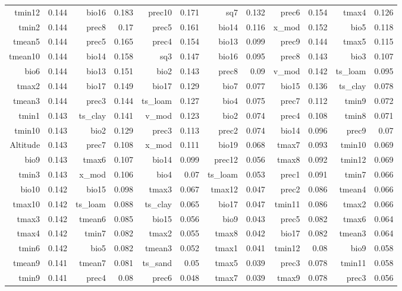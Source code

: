 \documentclass[12pt]{article}
\begin{document}
\begin{table}[htbp]
\begin{tabular}{rrrrrrrrrrrr}
    tmin12 & 0.144 & bio16 & 0.183 & prec10 & 0.171 & sq7   & 0.132 & prec6 & 0.154 & tmax4 & 0.126 \\
    tmin2 & 0.144 & prec8 & 0.17  & prec5 & 0.161 & bio14 & 0.116 & x\_mod & 0.152 & bio5  & 0.118 \\
    tmean5 & 0.144 & prec5 & 0.165 & prec4 & 0.154 & bio13 & 0.099 & prec9 & 0.144 & tmax5 & 0.115 \\
    tmean10 & 0.144 & bio14 & 0.158 & sq3   & 0.147 & bio16 & 0.095 & prec8 & 0.143 & bio3  & 0.107 \\
    bio6  & 0.144 & bio13 & 0.151 & bio2  & 0.143 & prec8 & 0.09  & v\_mod & 0.142 & ts\_loam & 0.095 \\
    tmax2 & 0.144 & bio17 & 0.149 & bio17 & 0.129 & bio7  & 0.077 & bio15 & 0.136 & ts\_clay & 0.078 \\
    tmean3 & 0.144 & prec3 & 0.144 & ts\_loam & 0.127 & bio4  & 0.075 & prec7 & 0.112 & tmin9 & 0.072 \\
    tmin1 & 0.143 & ts\_clay & 0.141 & v\_mod & 0.123 & bio2  & 0.074 & prec4 & 0.108 & tmin8 & 0.071 \\
    tmin10 & 0.143 & bio2  & 0.129 & prec3 & 0.113 & prec2 & 0.074 & bio14 & 0.096 & prec9 & 0.07 \\
    Altitude & 0.143 & prec7 & 0.108 & x\_mod & 0.111 & bio19 & 0.068 & tmax7 & 0.093 & tmin10 & 0.069 \\
    bio9  & 0.143 & tmax6 & 0.107 & bio14 & 0.099 & prec12 & 0.056 & tmax8 & 0.092 & tmin12 & 0.069 \\
    tmin3 & 0.143 & x\_mod & 0.106 & bio4  & 0.07  & ts\_loam & 0.053 & prec1 & 0.091 & tmin7 & 0.066 \\
    bio10 & 0.142 & bio15 & 0.098 & tmax3 & 0.067 & tmax12 & 0.047 & prec2 & 0.086 & tmean4 & 0.066 \\
    tmax10 & 0.142 & ts\_loam & 0.088 & ts\_clay & 0.065 & bio17 & 0.047 & tmin11 & 0.086 & tmax2 & 0.066 \\
    tmax3 & 0.142 & tmean6 & 0.085 & bio15 & 0.056 & bio9  & 0.043 & prec5 & 0.082 & tmax6 & 0.064 \\
    tmax4 & 0.142 & tmin7 & 0.082 & tmax2 & 0.055 & tmax8 & 0.042 & bio17 & 0.082 & tmean3 & 0.064 \\
    tmin6 & 0.142 & bio5  & 0.082 & tmean3 & 0.052 & tmax1 & 0.041 & tmin12 & 0.08  & bio9  & 0.058 \\
    tmean9 & 0.141 & tmean7 & 0.081 & ts\_sand & 0.05  & tmax5 & 0.039 & prec3 & 0.078 & tmin11 & 0.058 \\
    tmin9 & 0.141 & prec4 & 0.08  & prec6 & 0.048 & tmax7 & 0.039 & tmax9 & 0.078 & prec3 & 0.056 \\

\end{tabular}
\end{table}
\end{document}
